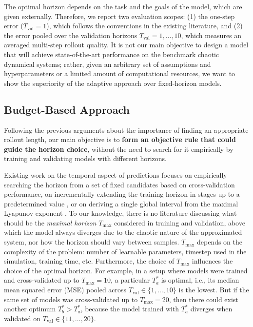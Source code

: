 \documentclass{article}
\begin{document}
The optimal horizon depends on the task and the goals of the model, which are given externally. Therefore, we report two evaluation scopes: (1) the one-step error ($T_{\mathrm{val}}=1$), which follows the conventions in the existing literature, and (2) the error pooled over the validation horizons $T_{\mathrm{val}} = 1, \dots, 10$, which measures an averaged multi-step rollout quality.
It is not our main objective to design a model that will achieve state-of-the-art performance on the benchmark chaotic dynamical systems; rather, given an arbitrary set of assumptions and hyperparameters or a limited amount of computational resources, we want to show the superiority of the adaptive approach over fixed-horizon models.

\subsection{Budget-Based Approach}
\label{sec:budget-based}

Following the previous arguments about the importance of finding an appropriate rollout length, our main objective is to \textbf{form an objective rule that could guide the horizon choice}, without the need to search for it empirically by training and validating models with different horizons.

Existing work on the temporal aspect of predictions focuses on empirically searching the horizon from a set of fixed candidates \cite{aceituno_temporal_2025} based on cross-validation performance, on incrementally extending the training horizon in stages up to a predetermined value \cite{zhuang_horizon_2025}, or on deriving a single global interval from the maximal Lyapunov exponent \cite{mikhaeil_difficulty_2022}. To our knowledge, there is no literature discussing what should be the \emph{maximal horizon} $T_{\max}$ considered in training and validation, above which the model always diverges due to the chaotic nature of the approximated system, nor how the horizon should vary between samples. $T_{\max}$ depends on the complexity of the problem: number of learnable parameters, timestep used in the simulation, training time, etc. Furthermore, the choice of $T_{\max}$ influences the choice of the optimal horizon. For example, in a setup where models were trained and cross-validated up to $T_{\max} = 10$, a particular $T^*_a$ is optimal, i.e., its median mean squared error (MSE) pooled across $T_\mathrm{val} \in \{1, \dots, 10\}$ is the lowest. But if the same set of models was cross-validated up to $T_{\max} = 20$, then there could exist another optimum $T^*_b > T^*_a$, because the model trained with $T^*_a$ diverges when validated on $T_\mathrm{val} \in \{11, \dots, 20\}$.
\end{document}
